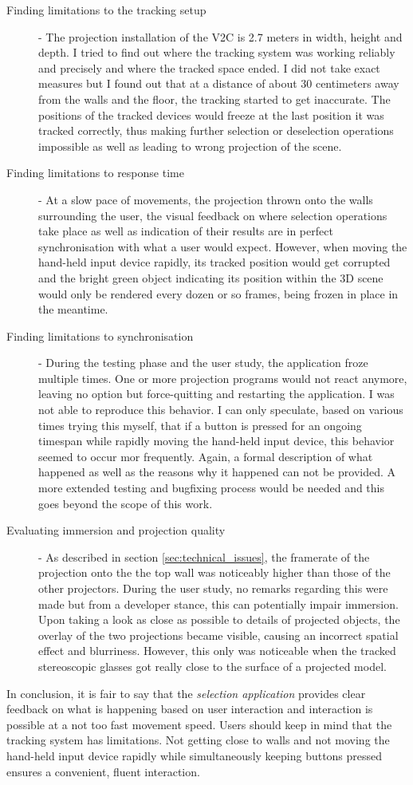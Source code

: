 \begin{description}
	\item[Finding limitations to the tracking setup] - The projection installation of the V2C is 2.7 meters in width, height and depth. I tried to find out where the tracking system was working reliably and precisely and where the tracked space ended. I did not take exact measures but I found out that at a distance of about 30 centimeters away from the walls and the floor, the tracking started to get inaccurate. The positions of the tracked devices would freeze at the last position it was tracked correctly, thus making further selection or deselection operations impossible as well as leading to wrong projection of the scene.
	\item[Finding limitations to response time] - At a slow pace of movements, the projection thrown onto the walls surrounding the user, the visual feedback on where selection operations take place as well as indication of their results are in perfect synchronisation with what a user would expect. However, when moving the hand-held input device rapidly, its tracked position would get corrupted and the bright green object indicating its position within the 3D scene would only be rendered every dozen or so frames, being frozen in place in the meantime.
	\item[Finding limitations to synchronisation] - During the testing phase and the user study, the application froze multiple times. One or more projection programs would not react anymore, leaving no option but force-quitting and restarting the application. I was not able to reproduce this behavior. I can only speculate, based on various times trying this myself, that if a button is pressed for an ongoing timespan while rapidly moving the hand-held input device, this behavior seemed to occur mor frequently. Again, a formal description of what happened as well as the reasons why it happened can not be provided. A more extended testing and bugfixing process would be needed and this goes beyond the scope of this work.
	\item[Evaluating immersion and projection quality] - As described in section \ref{sec:technical_issues}, the framerate of the projection onto the the top wall was noticeably higher than those of the other projectors. During the user study, no remarks regarding this were made but from a developer stance, this can potentially impair immersion. Upon taking a look as close as possible to details of projected objects, the overlay of the two projections became visible, causing an incorrect spatial effect and blurriness. However, this only was noticeable when the tracked stereoscopic glasses got really close to the surface of a projected model.
\end{description}

In conclusion, it is fair to say that the \textit{selection application} provides clear feedback on what is happening based on user interaction and interaction is possible at a not too fast movement speed. Users should keep in mind that the tracking system has limitations. Not getting close to walls and not moving the hand-held input device rapidly while simultaneously keeping buttons pressed ensures a convenient, fluent interaction.

